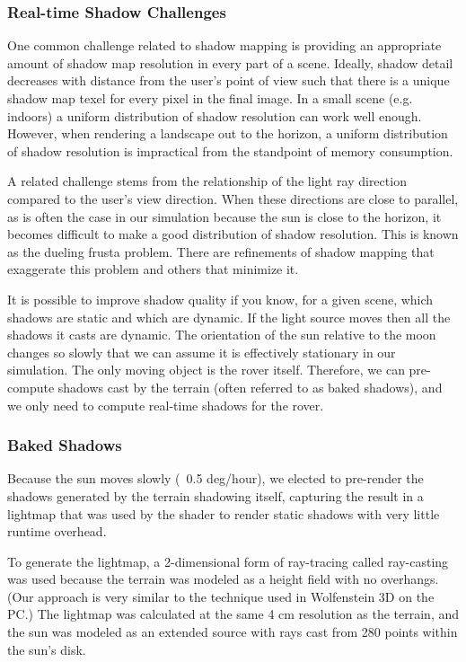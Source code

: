 \documentclass[twocolumn,letterpaper]{IEEEAerospaceCLS}  %
\begin{document}
\subsubsection{Real-time Shadow Challenges}
One common challenge related to shadow mapping is providing an appropriate amount of shadow map resolution in every part of a scene. Ideally, shadow detail decreases with distance from the user's point of view such that there is a unique shadow map texel for every pixel in the final image. In a small scene (e.g. indoors) a uniform distribution of shadow resolution can work well enough. However, when rendering a landscape out to the horizon, a uniform distribution of shadow resolution is impractical from the standpoint of memory consumption.

A related challenge stems from the relationship of the light ray direction compared to the user's view direction. When these directions are close to parallel, as is often the case in our simulation because the sun is close to the horizon, it becomes difficult to make a good distribution of shadow resolution. This is known as the dueling frusta problem. There are refinements of shadow mapping that exaggerate this problem and others that minimize it.

It is possible to improve shadow quality if you know, for a given scene, which shadows are static and which are dynamic. If the light source moves then all the shadows it casts are dynamic. The orientation of the sun relative to the moon changes so slowly that we can assume it is effectively stationary in our simulation. The only moving object is the rover itself. Therefore, we can pre-compute shadows cast by the terrain (often referred to as baked shadows), and we only need to compute real-time shadows for the rover.

\subsubsection{Baked Shadows}

Because the sun moves slowly (~0.5 deg/hour), we elected to pre-render the shadows generated by the terrain shadowing itself, capturing the result in a lightmap that was used by the shader to render static shadows with very little runtime overhead.

To generate the lightmap, a 2-dimensional form of ray-tracing called ray-casting was used because the terrain was modeled as a height field with no overhangs.  (Our approach is very similar to the technique used in Wolfenstein 3D on the PC.)  The lightmap was calculated at the same 4 cm resolution as the terrain, and the sun was modeled as an extended source with rays cast from 280 points within the sun's disk.
\end{document}
